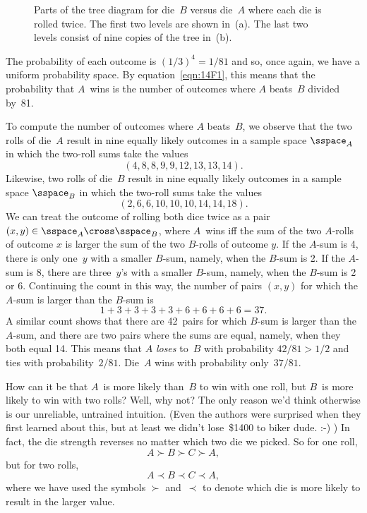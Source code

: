 \begin{figure}


\caption{Parts of the tree diagram for die~$B$ versus die~$A$ where
  each die is rolled twice.  The first two levels are shown in~(a).
  The last two levels consist of nine copies of the tree in~(b).}

\label{fig:14A11}

\end{figure}

The probability of each outcome is $(1/3)^4 = 1/81$ and so, once
again, we have a uniform probability space.  By
equation~\eqref{eqn:14F1}, this means that the probability that
$A$~wins is the number of outcomes where $A$ beats~$B$ divided by~81.

To compute the number of outcomes where $A$ beats~$B$, we observe that
the two rolls of die~$A$ result in nine equally likely 
outcomes in a sample space $\sspace_A$ in which the
two-roll sums take the values
\[
    (4, 8, 8, 9, 9, 12, 13, 13, 14).
\]
Likewise, two rolls of die~$B$ result in nine equally likely outcomes
in a sample space $\sspace_B$ in which the
two-roll sums take the values
\[
(2, 6, 6, 10, 10, 10, 14, 14, 18).
\]
We can treat the outcome of rolling both dice twice as a pair $(x,y) \in
\sspace_A \cross \sspace_B$, where $A$~wins iff the sum of the two
$A$-rolls of outcome $x$ is larger the sum of the two $B$-rolls of
outcome $y$.  If the $A$-sum is 4, there is only one~$y$ with a
smaller $B$-sum, namely, when the $B$-sum is 2.  If the $A$-sum is 8,
there are three~$y$'s with a smaller $B$-sum, namely, when the $B$-sum
is 2 or 6.  Continuing the count in this way, the number of pairs
$(x,y)$ for which the $A$-sum is larger than the $B$-sum is
\begin{equation*}
    1 + 3 + 3 + 3 + 3 + 6 + 6 + 6 + 6 = 37.
\end{equation*}
A similar count shows that there are 42~pairs for which $B$-sum is
larger than the $A$-sum, and there are two pairs where the sums are
equal, namely, when they both equal 14.  This means that $A$
\emph{loses} to~$B$ with probability $42/81 > 1/2$ and ties with
probability~$2/81$.  Die~$A$ wins with probability only~$37/81$.

How can it be that $A$~is more likely than~$B$ to win with one roll,
but $B$~is more likely to win with two rolls?  Well, why not?  The
only reason we'd think otherwise is our unreliable, untrained
intuition.  (Even the authors were surprised when they first learned
about this, but at least we didn't lose~\$1400 to biker dude. :-) )  In
fact, the die strength reverses no matter which two die we picked.  So
for one roll,
\begin{equation*}
    A \succ B \succ C \succ A,
\end{equation*}
but for two rolls,
\begin{equation*}
    A \prec B \prec C \prec A,
\end{equation*}
where we have used the symbols $\succ$ and~$\prec$ to denote which die
is more likely to result in the larger value.

